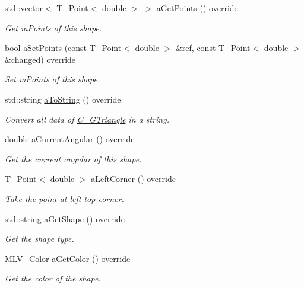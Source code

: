\begin{DoxyCompactItemize}
std\+::vector$<$ \hyperlink{classT__Point}{T\+\_\+\+Point}$<$ double $>$ $>$ \hyperlink{classC__GTriangle_af3c514a6f5516c297374004a94788877}{a\+Get\+Points} () override
\begin{DoxyCompactList}\small\item\em Get m\+Points of this shape. \end{DoxyCompactList}\item 
bool \hyperlink{classC__GTriangle_a18c134ddf90bc4f5729064a47094068b}{a\+Set\+Points} (const \hyperlink{classT__Point}{T\+\_\+\+Point}$<$ double $>$ \&ref, const \hyperlink{classT__Point}{T\+\_\+\+Point}$<$ double $>$ \&changed) override
\begin{DoxyCompactList}\small\item\em Set m\+Points of this shape. \end{DoxyCompactList}\item 
std\+::string \hyperlink{classC__GTriangle_aa432e8b8320db8a53ef1d59b486ed7ce}{a\+To\+String} () override
\begin{DoxyCompactList}\small\item\em Convert all data of \hyperlink{classC__GTriangle}{C\+\_\+\+G\+Triangle} in a string. \end{DoxyCompactList}\item 
double \hyperlink{classC__GTriangle_a98866648972bb78707c61aa7ebc22fb9}{a\+Current\+Angular} () override
\begin{DoxyCompactList}\small\item\em Get the current angular of this shape. \end{DoxyCompactList}\item 
\hyperlink{classT__Point}{T\+\_\+\+Point}$<$ double $>$ \hyperlink{classC__GTriangle_a57943afaad0f6b7c3c13aa35a233e93b}{a\+Left\+Corner} () override
\begin{DoxyCompactList}\small\item\em Take the point at left top corner. \end{DoxyCompactList}\item 
std\+::string \hyperlink{classC__GTriangle_a039e79bb17dae01997b11243de457d98}{a\+Get\+Shape} () override
\begin{DoxyCompactList}\small\item\em Get the shape type. \end{DoxyCompactList}\item 
M\+L\+V\+\_\+\+Color \hyperlink{classC__GTriangle_a19100d603f9239fd66f1115c4358f0fc}{a\+Get\+Color} () override
\begin{DoxyCompactList}\small\item\em Get the color of the shape. \end{DoxyCompactList}\item 

\end{DoxyCompactItemize}
